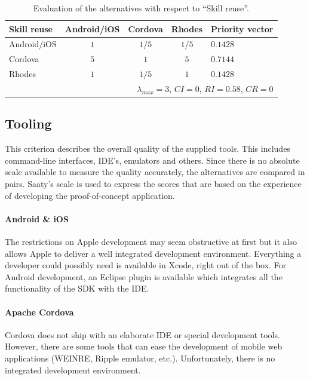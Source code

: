 \begin{table}[h!]
    \begin{center}
        \begin{tabular}{lcccl}
            \hline
            \textbf{Skill reuse} & Android/iOS & Cordova & Rhodes & Priority vector \\
            \hline
            Android/iOS          & $1$         & $1/5$   & $1/5$  & $0.1428$        \\
            Cordova              & $5$         & $1$     & $5$    & $0.7144$        \\
            Rhodes               & $1$         & $1/5$   & $1$    & $0.1428$        \\
            \hline
            \multicolumn{5}{r}{$\lambda_{max} = 3$, $CI = 0$, $RI = 0.58$, $CR = 0$}\\
            \hline
        \end{tabular}
        \caption{Evaluation of the alternatives with respect to ``Skill reuse''.}
        \label{tab:sr}
    \end{center}
\end{table}

\subsection{Tooling}

This criterion describes the overall quality of the supplied tools. This includes command-line interfaces, IDE's, emulators and others. Since there is no absolute scale available to measure the quality accurately, the alternatives are compared in pairs. Saaty's scale is used to express the scores that are based on the experience of developing the proof-of-concept application.

\paragraph{Android \& iOS} The restrictions on Apple development may seem obstructive at first but it also allows Apple to deliver a well integrated development environment. Everything a developer could possibly need is available in Xcode, right out of the box. For Android development, an Eclipse plugin is available which integrates all the functionality of the SDK with the IDE. 

\paragraph{Apache Cordova} Cordova does not ship with an elaborate IDE or special development tools. However, there are some tools that can ease the development of mobile web applications (WEINRE, Ripple emulator, etc.). Unfortunately, there is no integrated development environment. 


